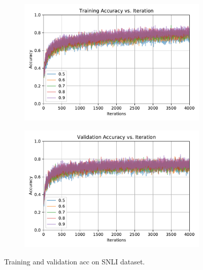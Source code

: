 \documentclass[10pt,twocolumn,letterpaper]{article}
\begin{document}
\begin{figure}
\centering
\begin{subfigure}{.5\textwidth}
  \centering
  \includegraphics[scale=0.45]{train_acc}
  \label{fig:train_acc}
\end{subfigure}%
\begin{subfigure}{.5\textwidth}
  \centering
  \includegraphics[scale=0.45]{dev_acc}
  \label{fig:dev_acc}
\end{subfigure}
\caption{Training and validation acc on SNLI dataset.}
\label{fig:acc}
\end{figure}
\end{document}
